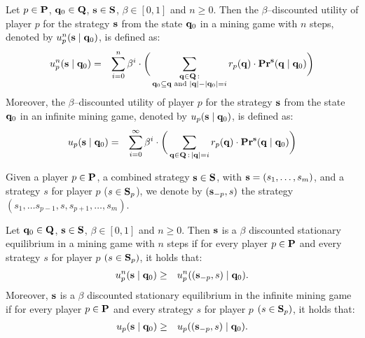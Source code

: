 \begin{mydef}
Let $p \in \mathbf{P}$, $\mathbf{q}_0 \in \mathbf{Q}$, $\mathbf{s} \in \mathbf{S}$, $\beta \in [0,1]$ and $n \geq 0$. Then the $\beta$--discounted utility of player $p$ for the strategy $\mathbf{s}$ from the state $\mathbf{q}_0$ in a mining game with $n$ steps, denoted by $u_p^n(\mathbf{s} \mid \mathbf{q}_0)$, is defined as:
\begin{eqnarray*}
u_p^n(\mathbf{s} \mid \mathbf{q}_0) & = & \sum_{i=0}^{n}\beta^{i} \cdot  \bigg(\sum_{\substack{\mathbf{q} \in \mathbf{Q} \,: \\ \mathbf{q}_0 \subseteq \mathbf{q} \text{ {\rm and} } |\mathbf{q}| - |\mathbf{q}_0| = i}} r_p(\mathbf{q}) \cdot 
\mathbf{Pr}^{\mathbf{s}}(\mathbf{q} \mid \mathbf{q}_0)\bigg)
\end{eqnarray*}
Moreover, the $\beta$--discounted utility of player $p$ for the strategy $\mathbf{s}$ from the state $\mathbf{q}_0$ in an infinite mining game, denoted by $u_p(\mathbf{s} \mid \mathbf{q}_0)$, is defined as:
\begin{eqnarray*}
u_p(\mathbf{s} \mid \mathbf{q}_0) & = & \sum_{i=0}^{\infty}\beta^{i} \cdot  \bigg(\sum_{\mathbf{q} \in \mathbf{Q} \,:\, |\mathbf{q}| = i} r_p(\mathbf{q}) \cdot 
\mathbf{Pr}^{\mathbf{s}}(\mathbf{q} \mid \mathbf{q}_0)\bigg)
\end{eqnarray*}
\end{mydef}
Given a player $p \in \mathbf{P}$, a combined strategy $\mathbf{s} \in \mathbf{S}$, with $\mathbf{s} = (s_1, \ldots, s_m)$, and a strategy $s$ for player $p$ ($s \in \mathbf{S}_p$), we denote by $(\mathbf{s}_{-p}, s)$ the strategy $(s_1, \ldots s_{p-1},s,s_{p+1}, \ldots, s_{m})$.
\begin{mydef}
Let $\mathbf{q}_0 \in \mathbf{Q}$, $\mathbf{s} \in \mathbf{S}$, $\beta \in [0,1]$ and $n \geq 0$. Then $\mathbf{s}$ is a $\beta$ discounted stationary equilibrium in a mining game with $n$ steps if for every player $p \in \mathbf{P}$ and every strategy $s$ for player $p$ $(s \in\mathbf{S}_p)$, it holds that:
\begin{eqnarray*}
u_p^n(\mathbf{s} \mid \mathbf{q}_0)  & \geq  & u_p^n((\mathbf{s}_{-p},s) \mid \mathbf{q}_0).
\end{eqnarray*}
Moreover, $\mathbf{s}$ is a $\beta$ discounted stationary equilibrium  in  the infinite mining game if for every player $p \in \mathbf{P}$ and every strategy $s$ for player $p$ $(s \in\mathbf{S}_p)$, it holds that:
\begin{eqnarray*}u_p(\mathbf{s} \mid \mathbf{q}_0)  & \geq  & u_p ((\mathbf{s}_{-p},s) \mid \mathbf{q}_0).
\end{eqnarray*}
\end{mydef}

